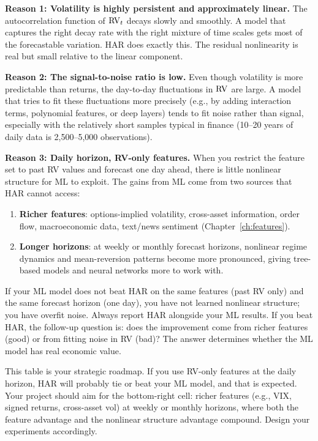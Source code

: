 \textbf{Reason 1: Volatility is highly persistent and approximately linear.}
The autocorrelation function of $\operatorname{RV}_t$ decays slowly and smoothly.
A model that captures the right decay rate with the right mixture of time scales gets most of the forecastable variation.
HAR does exactly this.
The residual nonlinearity is real but small relative to the linear component.

\textbf{Reason 2: The signal-to-noise ratio is low.}
Even though volatility is more predictable than returns, the day-to-day fluctuations in $\operatorname{RV}$ are large.
A model that tries to fit these fluctuations more precisely (e.g., by adding interaction terms, polynomial features, or deep layers) tends to fit noise rather than signal, especially with the relatively short samples typical in finance (10--20 years of daily data is 2,500--5,000 observations).

\textbf{Reason 3: Daily horizon, RV-only features.}
When you restrict the feature set to past RV values and forecast one day ahead, there is little nonlinear structure for ML to exploit.
The gains from ML come from two sources that HAR cannot access:
\begin{enumerate}[nosep]
  \item \textbf{Richer features}: options-implied volatility, cross-asset information, order flow, macroeconomic data, text/news sentiment (Chapter~\ref{ch:features}).
  \item \textbf{Longer horizons}: at weekly or monthly forecast horizons, nonlinear regime dynamics and mean-reversion patterns become more pronounced, giving tree-based models and neural networks more to work with.
\end{enumerate}

\begin{keyidea}
If your ML model does not beat HAR on the same features (past RV only) and the same forecast horizon (one day), you have not learned nonlinear structure; you have overfit noise.
Always report HAR alongside your ML results.
If you beat HAR, the follow-up question is: does the improvement come from richer features (good) or from fitting noise in RV (bad)?
The answer determines whether the ML model has real economic value.
\end{keyidea}

\begin{projectconnection}
This table is your strategic roadmap.
If you use RV-only features at the daily horizon, HAR will probably tie or beat your ML model, and that is expected.
Your project should aim for the bottom-right cell: richer features (e.g., VIX, signed returns, cross-asset vol) at weekly or monthly horizons, where both the feature advantage and the nonlinear structure advantage compound.
Design your experiments accordingly.
\end{projectconnection}

